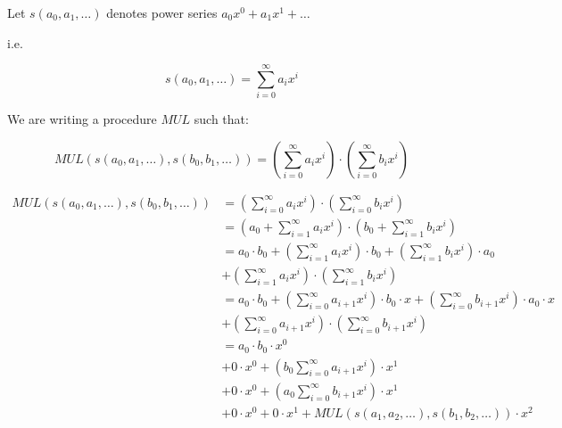 \documentclass[11pt,a4paper]{article}
\begin{document}
Let $s(a_0,a_1,\dots)$ denotes power series $a_0x^0+a_1x^1+\dots$

i.e.

\begin{equation*}
    s(a_0,a_1,\dots) = \sum_{i=0}^{\infty} a_ix^i
\end{equation*}

We are writing a procedure $MUL$ such that:

\begin{equation*}
    MUL( s(a_0,a_1,\dots), s(b_0,b_1,\dots)) =
    \left(\sum_{i=0}^{\infty} a_ix^i \right) \cdot
    \left(\sum_{i=0}^{\infty} b_ix^i \right)
\end{equation*}

\begin{align*}
    MUL(s(a_0,a_1,\dots), s(b_0,b_1,\dots))
    &= \left(\sum_{i=0}^{\infty} a_ix^i \right) \cdot
       \left(\sum_{i=0}^{\infty} b_ix^i \right) \\
    &= \left(a_0 + \sum_{i=1}^{\infty} a_ix^i \right) \cdot
       \left(b_0 + \sum_{i=1}^{\infty} b_ix^i \right) \\
    &= a_0 \cdot b_0
     + \left( \sum_{i=1}^{\infty} a_ix^i \right) \cdot b_0 
     + \left( \sum_{i=1}^{\infty} b_ix^i \right) \cdot a_0 \\
    &+  \left(\sum_{i=1}^{\infty} a_ix^i \right) \cdot
        \left(\sum_{i=1}^{\infty} b_ix^i \right) \\
    &= a_0 \cdot b_0
     + \left( \sum_{i=0}^{\infty} a_{i+1}x^i \right) \cdot b_0 \cdot x
     + \left( \sum_{i=0}^{\infty} b_{i+1}x^i \right) \cdot a_0 \cdot x \\
    &+  \left(\sum_{i=0}^{\infty} a_{i+1}x^i \right) \cdot
        \left(\sum_{i=0}^{\infty} b_{i+1}x^i \right) \\
    &= a_0 \cdot b_0 \cdot x^0 \\
    &+ 0 \cdot x^0 
         + \left( b_0 \sum_{i=0}^{\infty} a_{i+1}x^i \right) \cdot x^1 \\
    &+ 0 \cdot x^0
         + \left( a_0 \sum_{i=0}^{\infty} b_{i+1}x^i \right) \cdot x^1 \\
    &+ 0 \cdot x^0 + 0 \cdot x^1
         + MUL( s(a_1,a_2,\dots), s(b_1,b_2,\dots)) \cdot x^2
\end{align*}
\end{document}
